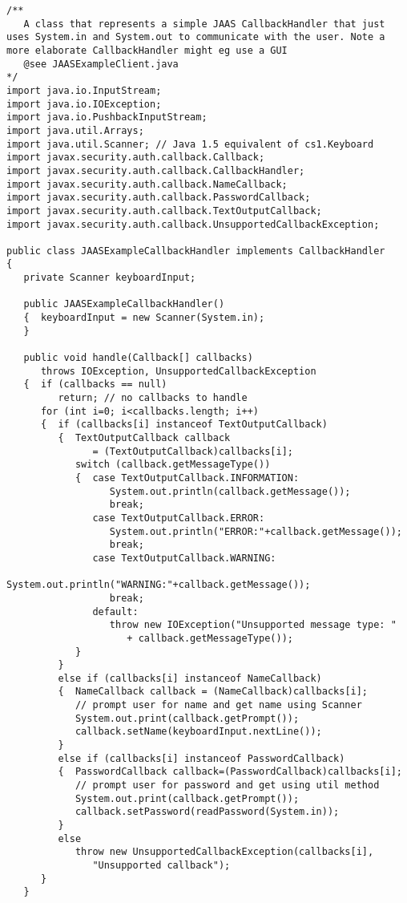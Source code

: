 \begin{lstlisting}[caption=JAAS Callback Handler]
/**
   A class that represents a simple JAAS CallbackHandler that just uses System.in and System.out to communicate with the user. Note a more elaborate CallbackHandler might eg use a GUI
   @see JAASExampleClient.java
*/
import java.io.InputStream;
import java.io.IOException;
import java.io.PushbackInputStream;
import java.util.Arrays;
import java.util.Scanner; // Java 1.5 equivalent of cs1.Keyboard
import javax.security.auth.callback.Callback;
import javax.security.auth.callback.CallbackHandler;
import javax.security.auth.callback.NameCallback;
import javax.security.auth.callback.PasswordCallback;
import javax.security.auth.callback.TextOutputCallback;
import javax.security.auth.callback.UnsupportedCallbackException;

public class JAASExampleCallbackHandler implements CallbackHandler
{
   private Scanner keyboardInput;

   public JAASExampleCallbackHandler()
   {  keyboardInput = new Scanner(System.in);
   }

   public void handle(Callback[] callbacks)
      throws IOException, UnsupportedCallbackException
   {  if (callbacks == null)
         return; // no callbacks to handle
      for (int i=0; i<callbacks.length; i++)
      {  if (callbacks[i] instanceof TextOutputCallback)
         {  TextOutputCallback callback
               = (TextOutputCallback)callbacks[i];
            switch (callback.getMessageType())
            {  case TextOutputCallback.INFORMATION:
                  System.out.println(callback.getMessage());
                  break;
               case TextOutputCallback.ERROR:
                  System.out.println("ERROR:"+callback.getMessage());
                  break;
               case TextOutputCallback.WARNING:
                  System.out.println("WARNING:"+callback.getMessage());
                  break;
               default:
                  throw new IOException("Unsupported message type: "
                     + callback.getMessageType());
            }
         }
         else if (callbacks[i] instanceof NameCallback)
         {  NameCallback callback = (NameCallback)callbacks[i];
            // prompt user for name and get name using Scanner
            System.out.print(callback.getPrompt());
            callback.setName(keyboardInput.nextLine());
         }
         else if (callbacks[i] instanceof PasswordCallback)
         {  PasswordCallback callback=(PasswordCallback)callbacks[i];
            // prompt user for password and get using util method
            System.out.print(callback.getPrompt());
            callback.setPassword(readPassword(System.in));
         }
         else
            throw new UnsupportedCallbackException(callbacks[i],
               "Unsupported callback");
      }
   }


\end{lstlisting}

